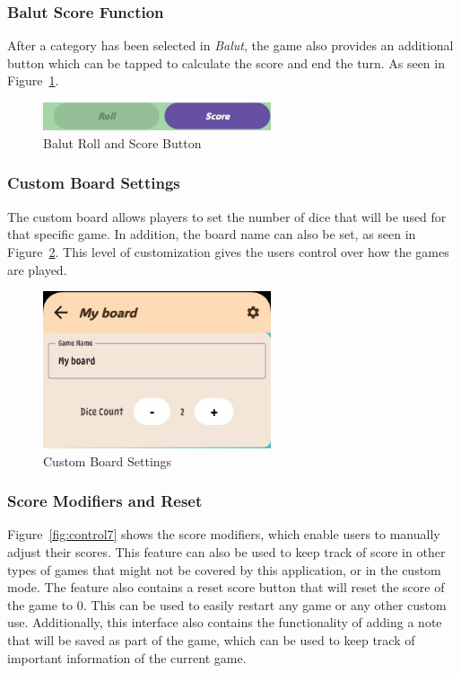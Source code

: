 \subsubsection{Balut Score Function}

After a category has been selected in \textit{Balut}, the game also provides an additional button which can be tapped to calculate the score and end the turn. As seen in Figure~\ref{fig:control5}.

\begin{figure}[ht!]
    \centering
    \includegraphics[width=0.6\textwidth]{img/control5.jpg}
    \caption{Balut Roll and Score Button}
    \label{fig:control5}
\end{figure}

\subsubsection{Custom Board Settings}

The custom board allows players to set the number of dice that will be used for that specific game. In addition, the board name can also be set, as seen in Figure~\ref{fig:control6}. This level of customization gives the users control over how the games are played.

\begin{figure}[ht!]
    \centering
    \includegraphics[width=0.6\textwidth]{img/control6.jpg}
    \caption{Custom Board Settings}
    \label{fig:control6}
\end{figure}

\subsubsection{Score Modifiers and Reset}

Figure~\ref{fig:control7} shows the score modifiers, which enable users to manually adjust their scores. This feature can also be used to keep track of score in other types of games that might not be covered by this application, or in the custom mode. The feature also contains a reset score button that will reset the score of the game to 0. This can be used to easily restart any game or any other custom use. Additionally, this interface also contains the functionality of adding a note that will be saved as part of the game, which can be used to keep track of important information of the current game.

